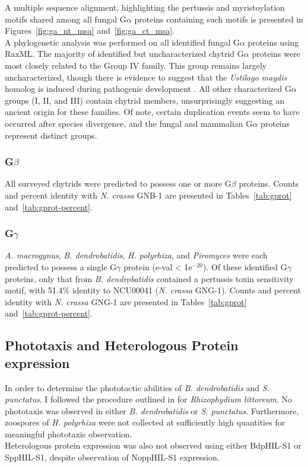 \indent A multiple sequence alignment, highlighting the pertussis and myristoylation motifs shared among all fungal G$\alpha$ proteins containing such motifs is presented in Figures~\ref{fig:ga_nt_msa} and~\ref{fig:ga_ct_msa}.\\
\indent A phylogenetic analysis was performed on all identified fungal G$\alpha$ proteins using RaxML. The majority of identified but uncharacterized chytrid G$\alpha$ proteins were most closely related to the Group IV family. This group remains largely uncharacterized, though there is evidence to suggest that the \textit{Ustilago maydis} homolog is induced during pathogenic development \cite{Bolker1998}. All other characterized G$\alpha$ groups (I, II, and III) contain chytrid members, unsurprisingly suggesting an ancient origin for these families. Of note, certain duplication events seem to have occurred after species divergence, and the fungal and mammalian G$\alpha$ proteins represent distinct groups.\\
\subsubsection{G$\beta$}
All surveyed chytrids were predicted to possess one or more G$\beta$ proteins. Counts and percent identity with \textit{N. crassa} GNB-1 are presented in Tables~\ref{tab:gprot} and~\ref{tab:gprot-percent}.
\subsubsection{G$\gamma$}
\textit{A. macrogynus}, \textit{B. dendrobatidis}, \textit{H. polyrhiza}, and \textit{Piromyces} were each predicted to possess a single G$\gamma$ protein (e-val < 1e$^{-20}$). Of these identified G$\gamma$ proteins, only that from \textit{B. dendrobatidis} contained a pertussis toxin sensitivity motif, with 51.4\% identity to NCU00041 (\textit{N. crassa} GNG-1). Counts and percent identity with \textit{N. crassa} GNG-1 are presented in Tables~\ref{tab:gprot} and~\ref{tab:gprot-percent}.
\subsection{Phototaxis and Heterologous Protein expression}
In order to determine the phototactic abilities of \textit{B. dendrobatidis} and \textit{S. punctatus}, I followed the procedure outlined in \cite{Muehlstein1987} for \textit{Rhizophydium littoreum}. No phototaxis was observed in either \textit{B. dendrobatidis} or \textit{S. punctatus}. Furthermore, zoospores of \textit{H. polyrhiza} were not collected at sufficiently high quantities for meaningful phototaxis observation.\\
\indent Heterologous protein expression was also not observed using either BdpHIL-S1 or SppHIL-S1, despite observation of NoppHIL-S1 expression.\\ 
